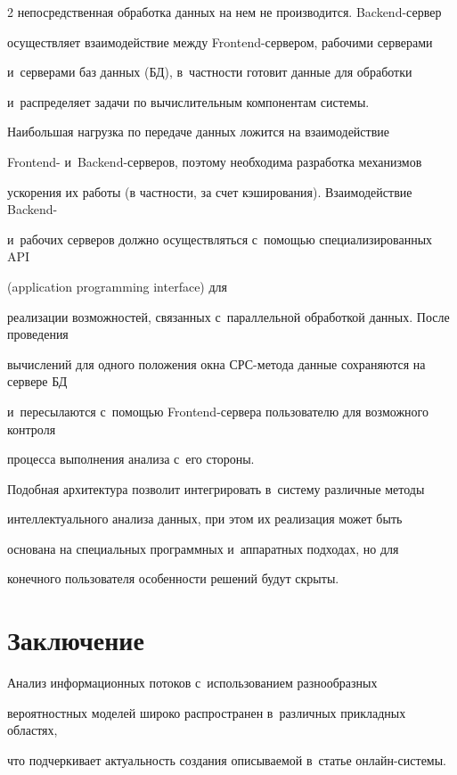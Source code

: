 \begin{multicols}{2}
непосредст\-венная обработка данных на нем не производится. Backend-сер\-вер 

осуществляет взаимодействие между Frontend-сер\-ве\-ром, рабочими серверами 

и~серверами баз данных (БД), в~част\-ности готовит данные для обработки 

и~распределяет задачи по вычислительным компонентам системы.



Наибольшая нагрузка по передаче данных ложится на взаимодействие 

Frontend- и~Backend-сер\-ве\-ров, поэтому необходима разработка механизмов 

ускорения их работы (в частности, за счет кэширования). Взаимодействие Backend- 

и~рабочих серверов должно осуществляться с~по\-мощью специализированных API 

(application programming interface) для 

реализации возможностей, связанных с~параллельной обработкой данных. После проведения 

вычислений для одного положения окна СРС-ме\-то\-да данные сохраняются на сервере БД 

и~пересылаются с~помощью Frontend-сер\-ве\-ра пользователю для возможного контроля 

процесса выполнения анализа с~его стороны.



Подобная архитектура позволит интегрировать в~систему различные методы 

интеллектуального анализа данных, при этом их реализация может быть 

основана на специальных программных  и~аппаратных подходах, но для 

конечного пользователя особенности решений будут скрыты.



\section{Заключение}



Анализ информационных потоков с~использованием разнообразных 

вероятностных моделей широко распространен в~различных прикладных областях, 

что подчеркивает актуальность создания описыва\-емой в~статье он\-лайн-сис\-те\-мы. 


\end{multicols}
